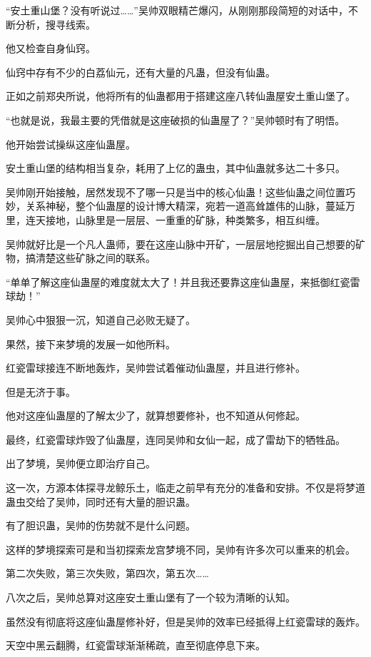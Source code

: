 \begin{this_body}
“安土重山堡？没有听说过……”吴帅双眼精芒爆闪，从刚刚那段简短的对话中，不断分析，搜寻线索。

他又检查自身仙窍。

仙窍中存有不少的白荔仙元，还有大量的凡蛊，但没有仙蛊。

正如之前郑央所说，他将所有的仙蛊都用于搭建这座八转仙蛊屋安土重山堡了。

“也就是说，我最主要的凭借就是这座破损的仙蛊屋了？”吴帅顿时有了明悟。

他开始尝试操纵这座仙蛊屋。

安土重山堡的结构相当复杂，耗用了上亿的蛊虫，其中仙蛊就多达二十多只。

吴帅刚开始接触，居然发现不了哪一只是当中的核心仙蛊！这些仙蛊之间位置巧妙，关系神秘，整个仙蛊屋的设计博大精深，宛若一道高耸雄伟的山脉，蔓延万里，连天接地，山脉里是一层层、一重重的矿脉，种类繁多，相互纠缠。

吴帅就好比是一个凡人蛊师，要在这座山脉中开矿，一层层地挖掘出自己想要的矿物，搞清楚这些矿脉之间的联系。

“单单了解这座仙蛊屋的难度就太大了！并且我还要靠这座仙蛊屋，来抵御红瓷雷球劫！”

吴帅心中狠狠一沉，知道自己必败无疑了。

果然，接下来梦境的发展一如他所料。

红瓷雷球接连不断地轰炸，吴帅尝试着催动仙蛊屋，并且进行修补。

但是无济于事。

他对这座仙蛊屋的了解太少了，就算想要修补，也不知道从何修起。

最终，红瓷雷球炸毁了仙蛊屋，连同吴帅和女仙一起，成了雷劫下的牺牲品。

出了梦境，吴帅便立即治疗自己。

这一次，方源本体探寻龙鲸乐土，临走之前早有充分的准备和安排。不仅是将梦道蛊虫交给了吴帅，同时还有大量的胆识蛊。

有了胆识蛊，吴帅的伤势就不是什么问题。

这样的梦境探索可是和当初探索龙宫梦境不同，吴帅有许多次可以重来的机会。

第二次失败，第三次失败，第四次，第五次……

八次之后，吴帅总算对这座安土重山堡有了一个较为清晰的认知。

虽然没有彻底将这座仙蛊屋修补好，但是吴帅的效率已经抵得上红瓷雷球的轰炸。

天空中黑云翻腾，红瓷雷球渐渐稀疏，直至彻底停息下来。


\end{this_body}
